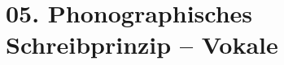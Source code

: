 \documentclass[handout,aspectratio=1610,dvipsnames]{beamer}
\begin{document}
  \section{05. Phonographisches Schreibprinzip -- Vokale}
  \let\woopsi\section\let\section\subsection\let\subsection\subsubsection
  
  \let\subsection\section\let\section\woopsi
  
\end{document}
